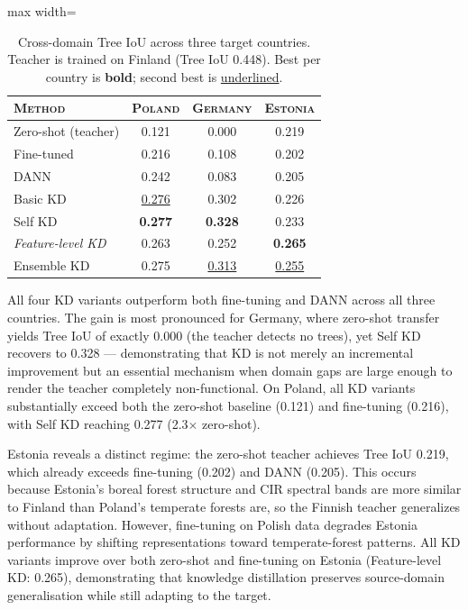 \documentclass[twocolumn]{article}
\begin{document}
\begin{table}[!t]
    \def\arraystretch{1.1}
    \centering
    \footnotesize
    \caption{Cross-domain Tree IoU across three target countries. Teacher is trained on Finland (Tree IoU 0.448). Best per country is \textbf{bold}; second best is \underline{underlined}.}
    \begin{adjustbox}{max width=\columnwidth}
    \begin{tabular}{lccc}
    \toprule
    \textsc{\textbf{Method}} &
    \textsc{\textbf{Poland}} &
    \textsc{\textbf{Germany}} &
    \textsc{\textbf{Estonia}} \\
    \midrule
    Zero-shot (teacher)               & 0.121 & 0.000 & 0.219 \\
    Fine-tuned                        & 0.216 & 0.108 & 0.202 \\
    DANN~\citep{ganin2016domain}      & 0.242 & 0.083 & 0.205 \\
    \midrule
    Basic KD                          & \underline{0.276} & 0.302 & 0.226 \\
    Self KD                           & \textbf{0.277} & \textbf{0.328} & 0.233 \\
    \textit{Feature-level KD}         & 0.263 & 0.252 & \textbf{0.265} \\
    Ensemble KD                       & 0.275 & \underline{0.313} & \underline{0.255} \\
    \bottomrule
    \end{tabular}
    \end{adjustbox}
\label{tbl:cross_domain}
\end{table}

All four KD variants outperform both fine-tuning and DANN across all three countries. The gain is most pronounced for Germany, where zero-shot transfer yields Tree IoU of exactly 0.000 (the teacher detects no trees), yet Self KD recovers to 0.328 --- demonstrating that KD is not merely an incremental improvement but an essential mechanism when domain gaps are large enough to render the teacher completely non-functional. On Poland, all KD variants substantially exceed both the zero-shot baseline (0.121) and fine-tuning (0.216), with Self KD reaching 0.277 (2.3$\times$ zero-shot).

Estonia reveals a distinct regime: the zero-shot teacher achieves Tree IoU 0.219, which already exceeds fine-tuning (0.202) and DANN (0.205). This occurs because Estonia's boreal forest structure and CIR spectral bands are more similar to Finland than Poland's temperate forests are, so the Finnish teacher generalizes without adaptation. However, fine-tuning on Polish data degrades Estonia performance by shifting representations toward temperate-forest patterns. All KD variants improve over both zero-shot and fine-tuning on Estonia (Feature-level KD: 0.265), demonstrating that knowledge distillation preserves source-domain generalisation while still adapting to the target.
\end{document}
